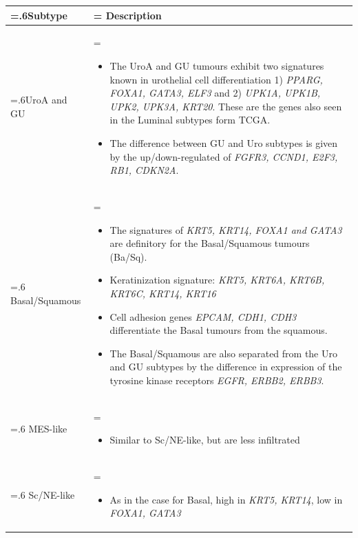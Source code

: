 \begin{table}[!htb]
    \centering
    \small
    \begin{tabularx}{\textwidth}{>{\hsize=.6\hsize}X |>{\hsize=\hsize}X}
    \toprule
    Subtype & Description \\
    \midrule
    UroA and GU & 
    \begin{itemize}[leftmargin=*, nosep, after=\vspace{-\baselineskip}]
        \item The UroA and GU tumours exhibit two signatures known in urothelial cell differentiation 1) \textit{PPARG, FOXA1, GATA3, ELF3} and 2) \textit{UPK1A, UPK1B, UPK2, UPK3A, KRT20}. These are the genes also seen in the Luminal subtypes form TCGA.
        \item The difference between GU and Uro subtypes is given by the up/down-regulated of \textit{FGFR3, CCND1, E2F3, RB1, CDKN2A}.
    \end{itemize} \\
    \midrule
    Basal/Squamous & 
    \begin{itemize}[leftmargin=*, nosep, after=\vspace{-\baselineskip}]
        \item The signatures of \textit{KRT5, KRT14, FOXA1 and GATA3} are definitory for the Basal/Squamous tumours (Ba/Sq). 
        \item Keratinization signature: \textit{KRT5, KRT6A, KRT6B, KRT6C, KRT14, KRT16}
        \item Cell adhesion genes \textit{EPCAM, CDH1, CDH3} differentiate the Basal tumours from the squamous.
        \item The Basal/Squamous are also separated from the Uro and GU subtypes by the difference in expression of the tyrosine kinase receptors \textit{EGFR, ERBB2, ERBB3}.
    \end{itemize} \\
    \midrule
    MES-like & 
    \begin{itemize}[leftmargin=*, nosep, after=\vspace{-\baselineskip}]
        \item Similar to Sc/NE-like, but are less infiltrated
    \end{itemize} \\
    \midrule
    Sc/NE-like & 
    \begin{itemize}[leftmargin=*, nosep, after=\vspace{-\baselineskip}]
        \item As in the case for Basal, high in \textit{KRT5, KRT14}, low in \textit{FOXA1, GATA3}

\end{itemize}
\end{tabularx}
\end{table}
